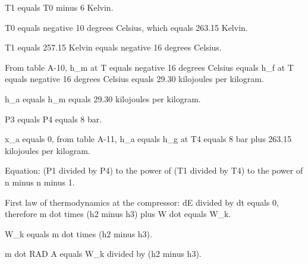T1 equals T0 minus 6 Kelvin.

T0 equals negative 10 degrees Celsius, which equals 263.15 Kelvin.

T1 equals 257.15 Kelvin equals negative 16 degrees Celsius.

From table A-10, h_m at T equals negative 16 degrees Celsius equals h_f at T equals negative 16 degrees Celsius equals 29.30 kilojoules per kilogram.

h_a equals h_m equals 29.30 kilojoules per kilogram.

P3 equals P4 equals 8 bar.

x_a equals 0, from table A-11, h_a equals h_g at T4 equals 8 bar plus 263.15 kilojoules per kilogram.

Equation: (P1 divided by P4) to the power of (T1 divided by T4) to the power of n minus n minus 1.

First law of thermodynamics at the compressor: dE divided by dt equals 0, therefore m dot times (h2 minus h3) plus W dot equals W_k.

W_k equals m dot times (h2 minus h3).

m dot RAD A equals W_k divided by (h2 minus h3).